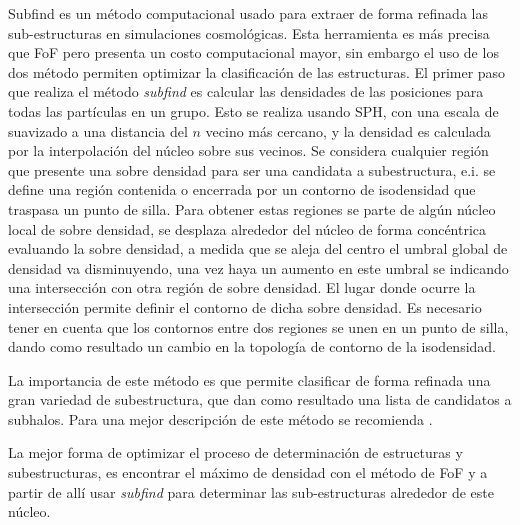 Subfind es un método computacional usado para extraer de forma refinada las sub-estructuras en simulaciones cosmológicas. Esta herramienta es más precisa que FoF pero presenta un costo computacional mayor, sin embargo el uso de los dos método permiten optimizar la clasificación de las estructuras. El primer paso que realiza el método {\it{subfind}} es calcular las densidades de las posiciones para todas las partículas en un grupo. Esto se realiza usando SPH, con una escala de suavizado a una distancia del $n$ vecino más cercano, y la densidad es calculada por la interpolación del núcleo sobre sus vecinos. Se considera cualquier región que presente una sobre densidad para ser una candidata a subestructura, e.i. se define una región contenida o encerrada por un contorno de isodensidad que traspasa un punto de silla. Para obtener estas regiones se parte de algún núcleo local de sobre densidad, se desplaza alrededor del núcleo de forma concéntrica evaluando la sobre densidad, a medida que se aleja del centro el umbral global de densidad va disminuyendo, una vez haya un aumento en este umbral  se indicando una intersección con otra región de sobre densidad. El lugar donde ocurre la intersección permite definir el contorno de dicha sobre densidad. Es necesario tener en cuenta que los contornos entre dos regiones se unen en un punto de silla, dando como resultado un cambio en la topología de contorno de la isodensidad.

La importancia de este método es que permite clasificar de forma  refinada una gran variedad de subestructura, que dan como resultado una lista de candidatos a subhalos. Para una mejor descripción de este método se recomienda \cite{springel2018}.

La mejor forma de optimizar el proceso de determinación de estructuras y subestructuras, es encontrar el máximo de densidad con el método de FoF y a partir de allí usar {\it{subfind}} para determinar las sub-estructuras alrededor de este núcleo.


















